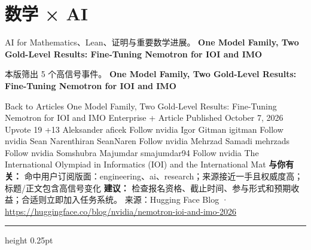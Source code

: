 \documentclass[10.5pt]{ctexart}
\begin{document}
\section*{数学 × AI}
{\color{ormuted} AI for Mathematics、Lean、证明与重要数学进展。}
\vspace{2mm}
{\LARGE\bfseries One Model Family, Two Gold-Level Results: Fine-Tuning Nemotron for IOI and IMO}\par
\vspace{1mm}
{\color{ormuted} 本版筛出 5 个高信号事件。}
\vspace{3mm}
{\Large\bfseries One Model Family, Two Gold-Level Results: Fine-Tuning Nemotron for IOI and IMO}\par
Back to Articles One Model Family, Two Gold-Level Results: Fine-Tuning Nemotron for IOI and IMO Enterprise + Article Published October 7, 2026 Upvote 19 +13 Aleksander aficek Follow nvidia Igor Gitman igitman Follow nvidia Sean Narenthiran SeanNaren Follow nvidia Mehrzad Samadi mehrzads Follow nvidia Somshubra Majumdar smajumdar94 Follow nvidia The International Olympiad in Informatics (IOI) and the International Mat
\textbf{与你有关：} 命中用户订阅版面：engineering、ai、research；来源接近一手且权威度高；标题/正文包含高信号变化
\textbf{建议：} 检查报名资格、截止时间、参与形式和预期收益；合适则立即加入任务系统。
{\footnotesize\color{ormuted} 来源：Hugging Face Blog · \url{https://huggingface.co/blog/nvidia/nemotron-ioi-and-imo-2026}}
\vspace{4mm}
\hrule height 0.25pt
\vspace{3mm}
\end{document}
